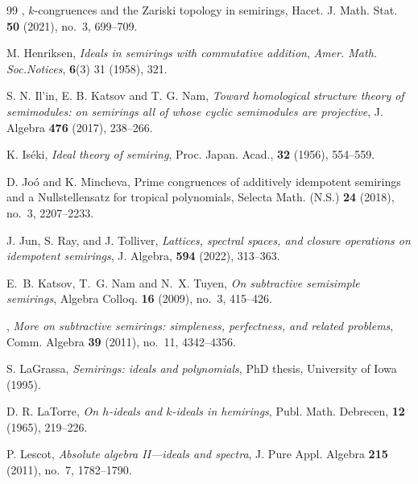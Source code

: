\documentclass[11pt,leqno]{amsart}
\theoremstyle{definition}
\numberwithin{equation}{section}
\begin{document}
\begin{thebibliography}{99}
 \bysame, $k$-congruences and the Zariski topology in semirings, Hacet. J. Math. Stat. {\bf 50} (2021), no.~3, 699--709.
	
 M. Henriksen, \textit{Ideals in semirings with commutative addition}, \textit{Amer. Math. Soc.Notices}, \textbf{6}(3) 31 (1958), 321.
	
	
 S. N. Il'in, E. B. Katsov and T. G. Nam, \textit{Toward homological structure theory of semimodules: on semirings all of whose cyclic semimodules are projective}, J. Algebra {\bf 476} (2017), 238--266.
	
	
 K. Is\'{e}ki, \textit{Ideal theory of semiring}, Proc. Japan. Acad., \textbf{32} (1956), 554--559.

 D. Jo\'o{} and K. Mincheva, Prime congruences of additively idempotent semirings and a Nullstellensatz for tropical polynomials, Selecta Math. (N.S.) {\bf 24} (2018), no.~3, 2207--2233.

    
 J. Jun, S. Ray, and J. Tolliver, \textit{Lattices, spectral spaces, and closure operations on idempotent semirings}, J. Algebra, \textbf{594} (2022), 313--363.

 E.~B. Katsov, T.~G. Nam and N.~X. Tuyen, \textit{On subtractive semisimple semirings}, Algebra Colloq. {\bf 16} (2009), no.~3, 415--426.

 \bysame, \textit{More on subtractive semirings: simpleness, perfectness, and related problems}, Comm. Algebra {\bf 39} (2011), no.~11, 4342--4356.
	
 
 S. LaGrassa, \textit{Semirings: ideals and polynomials}, PhD thesis, University of Iowa (1995).

	
 D. R. LaTorre, \textit{On $h$-ideals and $k$-ideals in hemirings}, Publ. Math. Debrecen, \textbf{12} (1965), 219--226.

 P. Lescot, \textit{Absolute algebra II---ideals and spectra}, J. Pure Appl. Algebra {\bf 215} (2011), no.~7, 1782--1790.
	

\end{thebibliography}
\end{document}
